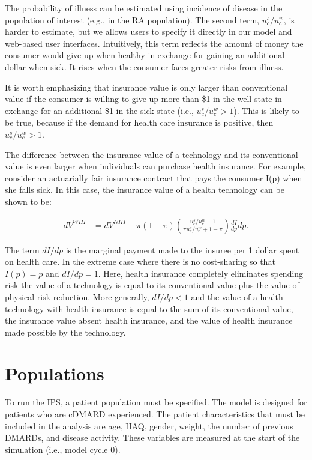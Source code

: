 \documentclass[11pt,final,fleqn]{article}
\theoremstyle{plain}
\begin{document}
The probability of illness can be estimated using incidence of disease in the population of interest (e.g., in the RA population). The second term, $u_c^s/u_c^w$, is harder to estimate, but we allows users to specify it directly in our model and web-based user interfaces. Intuitively, this term reflects the amount of money the consumer would give up when healthy in exchange for gaining an additional dollar when sick. It rises when the consumer faces greater risks from illness.

It is worth emphasizing that insurance value is only larger than conventional value if the consumer is willing to give up more than \$1 in the well state in exchange for an additional \$1 in the sick state (i.e., $u_c^s/u_c^w > 1$). This is likely to be true, because if the demand for health care insurance is positive, then $u_c^s/u_c^w > 1$.

The difference between the insurance value of a technology and its conventional value is even larger when individuals can purchase health insurance. For example, consider an actuarially fair insurance contract that pays the consumer I(p) when she falls sick. In this case, the insurance value of a health technology can be shown to be:

\begin{align}
dV^{WHI} &= dV^{NHI} + \pi (1 - \pi)\left(\frac{u_c^s/u_c^w - 1}{\pi u_c^s/u_c^w + 1 - \pi}\right)\frac{dI}{dp}dp.
\end{align}

The term $dI/dp$ is the marginal payment made to the insuree per 1 dollar spent on health care. In the extreme case where there is no cost-sharing so that $I(p) = p$ and $dI/dp = 1$. Here, health insurance completely eliminates spending risk the value of a technology is equal to its conventional value plus the value of physical risk reduction. More generally, $dI/dp < 1$ and the value of a health technology with health insurance is equal to the sum of its conventional value, the insurance value absent health insurance, and the value of health insurance made possible by the technology. 

\section{Populations}\label{sec:populations}
To run the IPS, a patient population must be specified. The model is designed for patients who are cDMARD experienced. The patient characteristics that must be included in the analysis are age, HAQ, gender, weight, the number of previous DMARDs, and disease activity. These variables are measured at the start of the simulation (i.e., model cycle 0).  
\end{document}

